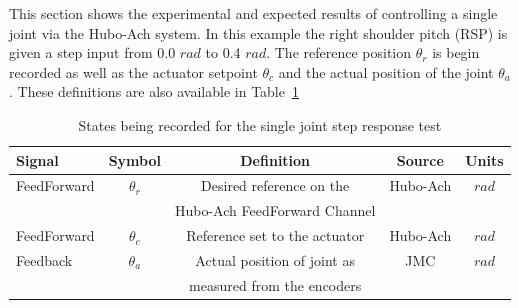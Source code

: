 This section shows the experimental and expected results of controlling a single joint via the Hubo-Ach system.
In this example the right shoulder pitch (RSP) is given a step input from 0.0 $rad$ to 0.4 $rad$.
The reference position $\theta_r$ is begin recorded as well as the actuator setpoint $\theta_c$ and the actual position of the joint $\theta_a$.
These definitions are also available in Table~\ref{table:recorded}

\begin{table}
\centering
\caption{States being recorded for the single joint step response test}
\begin{tabular}{l || c | c | c | c}
Signal      & Symbol     & Definition                    & Source      & Units \\
\hline
\hline
FeedForward & $\theta_r$ & Desired reference on the      & Hubo-Ach   & $rad$ \\
            &            & Hubo-Ach FeedForward Channel  &            &       \\
\hline
FeedForward & $\theta_c$ & Reference set to the actuator & Hubo-Ach   & $rad$ \\
\hline
Feedback    & $\theta_a$ & Actual position of joint as   & JMC        & $rad$ \\
            &            & measured from the encoders    &            &       \\
\hline
\end{tabular}
\label{table:recorded}
\end{table}



